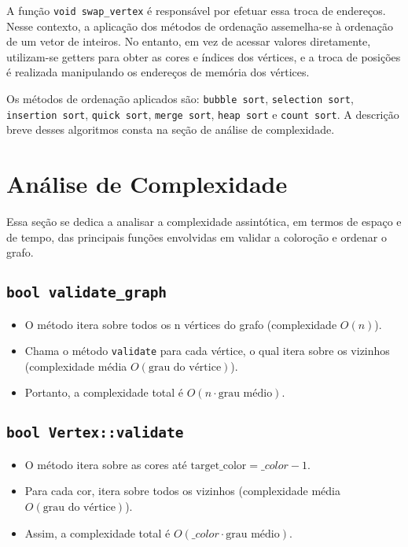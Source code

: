 \documentclass{article}
\begin{document}
A função \texttt{void swap\_vertex} é responsável por efetuar essa troca de endereços. Nesse contexto, a aplicação dos métodos de ordenação assemelha-se à ordenação de um vetor de inteiros. No entanto, em vez de acessar valores diretamente, utilizam-se getters para obter as cores e índices dos vértices, e a troca de posições é realizada manipulando os endereços de memória dos vértices.

Os métodos de ordenação aplicados são: \texttt{bubble sort}, \texttt{selection sort}, \texttt{insertion sort}, \texttt{quick sort}, \texttt{merge sort}, \texttt{heap sort} e \texttt{count sort}.
A descrição breve desses algoritmos consta na seção de análise de complexidade.

\section{Análise de Complexidade}
Essa seção se dedica a analisar a complexidade assintótica, em termos de espaço e de tempo, das principais funções envolvidas em validar a coloroção e ordenar o grafo.


\subsection{\texttt{bool validate\_graph}}
   \begin{itemize}
     \item O método itera sobre todos os n vértices do grafo (complexidade \(O(n)\)).
     \item Chama o método \texttt{validate} para cada vértice, o qual itera sobre os vizinhos (complexidade média \(O(\text{{grau do vértice}})\)).
     \item Portanto, a complexidade total é \(O(n \cdot \text{{grau médio}})\).
   \end{itemize}

\subsection{\texttt{bool Vertex::validate}}
   \begin{itemize}
     \item O método itera sobre as cores até \(\text{{target\_color}} = \_color - 1\).
     \item Para cada cor, itera sobre todos os vizinhos (complexidade média \(O(\text{{grau do vértice}})\)).
     \item Assim, a complexidade total é \(O(\_color \cdot \text{{grau médio}})\).
   \end{itemize}
   
\end{document}
